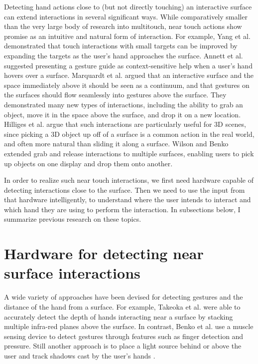 \label{chapter:related_works}
Detecting hand actions close to (but not directly touching) an interactive
surface can extend interactions in several significant ways. 
While comparatively smaller than the very large body of research into multitouch, near touch actions show promise as an intuitive and natural form of interaction. 
For example, Yang et al. \cite{Yang:2011:touchcuts} demonstrated that touch interactions with small targets can be improved by expanding the targets as the user's hand approaches the surface. 
Annett et al. \cite{Annett:2011:MPAMT} suggested presenting a gesture guide as context-sensitive help when a user's hand hovers over a surface. 
Marquardt et al.\cite{Marquardt:2011:DUHPTI} argued that an interactive surface and the space immediately above it should be seen as a continuum, and that gestures on the surfaces should flow seamlessly into gestures above the surface. 
They demonstrated many new types of interactions, including the ability to grab an object, move it in the space above the surface, and drop it on a new location. 
Hilliges et al.\cite{Hilliges:2009:IAAFDIT} argue that such interactions are particularly useful for 3D scenes, since picking a 3D object up off of a surface is a common action in the real world, and often more natural than sliding it along a surface. Wilson and Benko \cite{wilson:2010:CMDCPIOABS} extended grab and release interactions to multiple surfaces, enabling users to pick up objects on one display and drop them onto another.

In order to realize such near touch interactions, we first need hardware capable of detecting interactions close to the surface. 
Then we need to use the input from that hardware intelligently, to understand where the user intends to interact and which hand they are using to perform the interaction. 
In subsections below, I summarize previous research on these topics.

\section{Hardware for detecting near surface interactions}
A wide variety of approaches have been devised for detecting gestures and the distance of the hand from a surface. 
For example, Takeoka et al.\cite{Takeoka:2010:ZTOUCH} were able to accurately detect the depth of hands interacting near a surface by stacking multiple infra-red planes above the surface. 
In contrast, Benko et al. \cite{Benko:2009:EIOASMS} use a muscle sensing device to detect gestures through features such as finger detection and pressure. 
Still another approach is to place a light source behind or above the user and track shadows cast by the user's hands \cite{Echtler:2008:STMT} \cite{Brandl:2007:ARPSUDPHG}.

